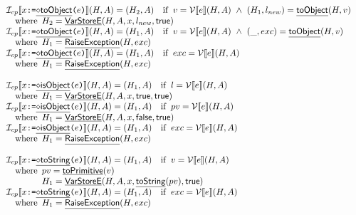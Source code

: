 \[\begin{array}{ll}
\I _{cp}\lbr x \TT{:=} \chfi{toObject}\TT{(}e\TT{)} \rbr(H,A)
 = (H_2,A)\quad\ifc{v = \V\lbr e\rbr(H,A)\ \land\ (H_1, l_{new}) = \chf{toObject}(H, v)}\\
 \quad\wherec{
   H_2=\chf{VarStoreE}(H,A,x,l_{new},\SF{true})
}\\
\I _{cp}\lbr x \TT{:=} \chfi{toObject}\TT{(}e\TT{)} \rbr(H,A)
 = (H_1, A)\quad\ifc{v = \V\lbr e\rbr(H,A)\ \land\ (\_, exc) = \chf{toObject}(H, v)}\\
 \quad\wherec{
   H_1=\chf{RaiseException}(H,exc)
}\\
\I _{cp}\lbr x \TT{:=} \chfi{toObject}\TT{(}e\TT{)} \rbr(H,A)
 = (H_1, A)\quad\ifc{exc = \V\lbr e\rbr(H,A)}\\
\quad\wherec{
  H_1=\chf{RaiseException}(H, exc)
}
\\\\
\I _{cp}\lbr x \TT{:=} \chfi{isObject}\TT{(}e\TT{)} \rbr(H,A)
 = (H_1,A)\quad\ifc{l = \V\lbr e\rbr(H,A)}\\
\quad\wherec{
  H_1=\chf{VarStoreE}(H,A,x,\vtrue,\SF{true})
}\\
\I _{cp}\lbr x \TT{:=} \chfi{isObject}\TT{(}e\TT{)} \rbr(H,A)
 = (H_1,A)\quad\ifc{pv = \V\lbr e\rbr(H,A)}\\
\quad\wherec{
  H_1 = \chf{VarStoreE}(H,A,x,\vfalse,\SF{true})
}\\
\I _{cp}\lbr x \TT{:=} \chfi{isObject}\TT{(}e\TT{)} \rbr(H,A)
 = (H_1, A)\quad\ifc{exc = \V\lbr e\rbr(H,A)}\\
\quad\wherec{
  H_1=\chf{RaiseException}(H,exc)
}
\\\\
\I _{cp}\lbr x \TT{:=} \chfi{toString}\TT{(}e\TT{)} \rbr(H,A)
= (H_1, A)\quad\ifc{v = \V\lbr e\rbr(H,A)}
\\\quad\wherec{
  pv=\chf{toPrimitive}(v)\\
  H_1=\chf{VarStoreE}(H,A,x,\chf{toString}(pv),\vtrue)\\
}\\
\I _{cp}\lbr x \TT{:=} \chfi{toString}\TT{(}e\TT{)} \rbr(H,A)
 = (H_1, A)\quad\ifc{exc = \V\lbr e\rbr(H,A)}\\
\quad\wherec{
  H_1=\chf{RaiseException}(H,exc)
}
\\\\
\end{array}
\]
